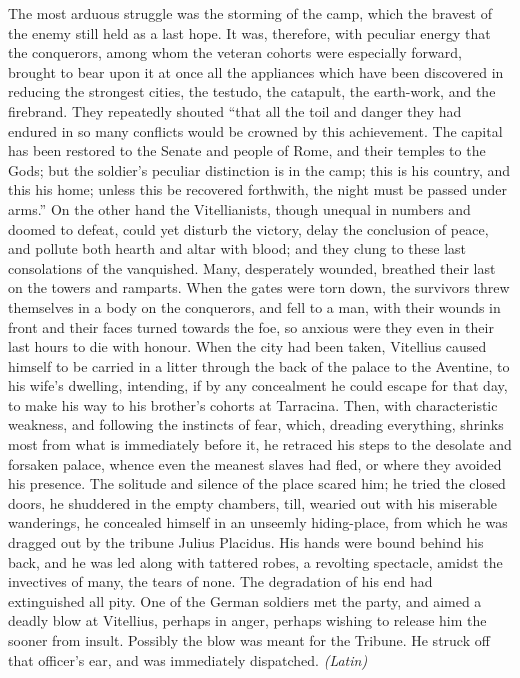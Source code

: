 
The most arduous struggle was the storming of the camp, which the bravest of the enemy still held as a last hope. It was, therefore, with peculiar energy that the conquerors, among whom the veteran cohorts were especially forward, brought to bear upon it at once all the appliances which have been discovered in reducing the strongest cities, the testudo, the catapult, the earth-work, and the firebrand. They repeatedly shouted ``that all the toil and danger they had endured in so many conflicts would be crowned by this achievement. The capital has been restored to the Senate and people of Rome, and their temples to the Gods; but the soldier's peculiar distinction is in the camp; this is his country, and this his home; unless this be recovered forthwith, the night must be passed under arms.'' On the other hand the Vitellianists, though unequal in numbers and doomed to defeat, could yet disturb the victory, delay the conclusion of peace, and pollute both hearth and altar with blood; and they clung to these last consolations of the vanquished. Many, desperately wounded, breathed their last on the towers and ramparts. When the gates were torn down, the survivors threw themselves in a body on the conquerors, and fell to a man, with their wounds in front and their faces turned towards the foe, so anxious were they even in their last hours to die with honour. When the city had been taken, Vitellius caused himself to be carried in a litter through the back of the palace to the Aventine, to his wife's dwelling, intending, if by any concealment he could escape for that day, to make his way to his brother's cohorts at Tarracina. Then, with characteristic weakness, and following the instincts of fear, which, dreading everything, shrinks most from what is immediately before it, he retraced his steps to the desolate and forsaken palace, whence even the meanest slaves had fled, or where they avoided his presence. The solitude and silence of the place scared him; he tried the closed doors, he shuddered in the empty chambers, till, wearied out with his miserable wanderings, he concealed himself in an unseemly hiding-place, from which he was dragged out by the tribune Julius Placidus. His hands were bound behind his back, and he was led along with tattered robes, a revolting spectacle, amidst the invectives of many, the tears of none. The degradation of his end had extinguished all pity. One of the German soldiers met the party, and aimed a deadly blow at Vitellius, perhaps in anger, perhaps wishing to release him the sooner from insult. Possibly the blow was meant for the Tribune. He struck off that officer's ear, and was immediately dispatched. \emph{(Latin)}

